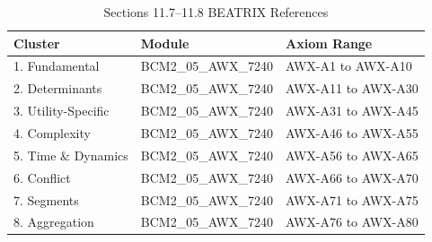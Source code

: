 \begin{table}[htbp]
\centering
\caption{Sections 11.7--11.8 BEATRIX References}
\label{tab:11-7-8-beatrix}
\renewcommand{\arraystretch}{1.3}
\begin{tabular}{@{}lll@{}}
\toprule
\textbf{Cluster} & \textbf{Module} & \textbf{Axiom Range} \\
\midrule
1. Fundamental & BCM2\_05\_AWX\_7240 & AWX-A1 to AWX-A10 \\
2. Determinants & BCM2\_05\_AWX\_7240 & AWX-A11 to AWX-A30 \\
3. Utility-Specific & BCM2\_05\_AWX\_7240 & AWX-A31 to AWX-A45 \\
4. Complexity & BCM2\_05\_AWX\_7240 & AWX-A46 to AWX-A55 \\
5. Time \& Dynamics & BCM2\_05\_AWX\_7240 & AWX-A56 to AWX-A65 \\
6. Conflict & BCM2\_05\_AWX\_7240 & AWX-A66 to AWX-A70 \\
7. Segments & BCM2\_05\_AWX\_7240 & AWX-A71 to AWX-A75 \\
8. Aggregation & BCM2\_05\_AWX\_7240 & AWX-A76 to AWX-A80 \\
\bottomrule
\end{tabular}
\end{table}

